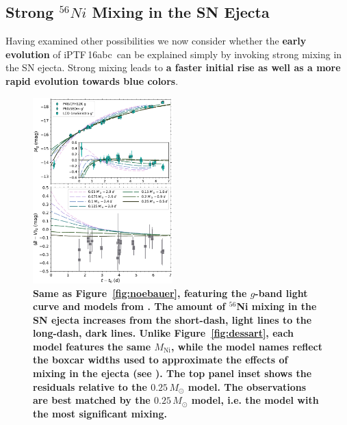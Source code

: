 \documentclass[twocolumn]{aastex61}
\newcommand{\abc}{iPTF\,16abc}
\begin{document}
\subsection{Strong $^{56}Ni$ Mixing in the SN Ejecta}
\label{sec:Ni_mixing}

Having examined other possibilities we now consider whether the \textbf{early evolution} of \abc\ can be explained simply by invoking strong mixing in the 
SN ejecta. Strong mixing leads to \textbf{a faster initial rise as well as a more rapid evolution towards blue colors}.

\begin{figure}[]
  \centering
  \includegraphics[width=0.48\textwidth]{compare_Piro.pdf}
  \caption{
  \textbf{Same as Figure~\ref{fig:noebauer}, featuring the $g$-band light
  curve and models from \citet{2016ApJ...826...96P}. The amount of $^{56}$Ni
  mixing in the SN ejecta increases from the short-dash, light lines to the
  long-dash, dark lines. Unlike Figure~\ref{fig:dessart}, each model features
  the same $M_\mathrm{Ni}$, while the model names reflect the boxcar widths
  used to approximate the effects of mixing in the ejecta (see
  \citealt{2016ApJ...826...96P}). The top panel inset shows the residuals
  relative to the $0.25\,M_\odot$ model. The observations are best matched by
  the $0.25\,M_\odot$ model, i.e. the model with the most significant mixing.}}
  \label{fig:piro}
\end{figure}
\end{document}
